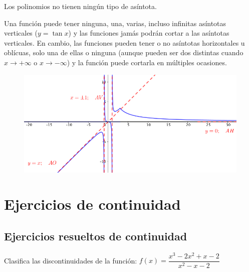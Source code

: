 	Los polinomios no tienen ningún tipo de asíntota.
	
	Una función puede tener ninguna, una, varias, incluso infinitas asíntotas verticales ($y=\tan x$) y las funciones jamás podrán cortar a las asíntotas verticales. En cambio, las funciones pueden tener o no asíntotas horizontales u oblícuas, solo una de ellas o ninguna (aunque pueden ser dos distintas cuando $x\to +\infty$ o $x\to -\infty$) y la función puede cortarla en múltiples ocasiones.

	\begin{figure}[H]
			\centering
			\includegraphics[width=0.75
			\textwidth]{imagenes/imagenes03/T03IM15.png}
		\end{figure}
	
	
	\section{Ejercicios de continuidad}
	\subsection{Ejercicios resueltos de continuidad}
	
	
	
	\begin{ejre} Clasifica las discontinuidades de la  función:  $f(x)=\dfrac {x^3-2x^2+x-2}{x^2-x-2} $
		
	\end{ejre}
	
